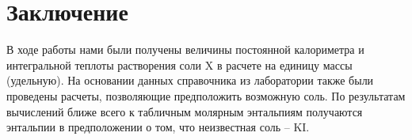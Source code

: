 \documentclass[a4paper, 12pt]{article}
\begin{document}
\section{Заключение}
В ходе работы нами были получены величины постоянной калориметра и интегральной теплоты растворения соли X в расчете на единицу массы (удельную). На основании данных справочника из лаборатории также были проведены расчеты, позволяющие предположить возможную соль.
По результатам вычислений ближе всего к табличным молярным энтальпиям получаются энтальпии в предположении о том, что неизвестная соль
 -- KI.
\end{document}

